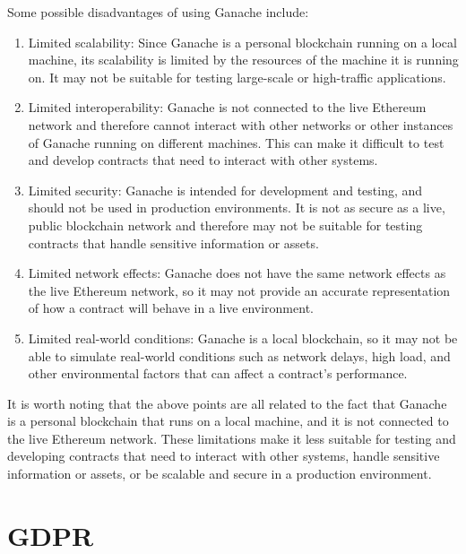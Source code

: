 \documentclass[target=mst,aauheader=]{thud}
\begin{document}
Some possible disadvantages of using Ganache include:

\begin{enumerate}

    \item Limited scalability: Since Ganache is a personal blockchain running on a local machine, its scalability is limited by the resources of the machine it is running on. It may not be suitable for testing large-scale or high-traffic applications.
    \item Limited interoperability: Ganache is not connected to the live Ethereum network and therefore cannot interact with other networks or other instances of Ganache running on different machines. This can make it difficult to test and develop contracts that need to interact with other systems.
    \item Limited security: Ganache is intended for development and testing, and should not be used in production environments. It is not as secure as a live, public blockchain network and therefore may not be suitable for testing contracts that handle sensitive information or assets.
    \item Limited network effects: Ganache does not have the same network effects as the live Ethereum network, so it may not provide an accurate representation of how a contract will behave in a live environment.
    \item Limited real-world conditions: Ganache is a local blockchain, so it may not be able to simulate real-world conditions such as network delays, high load, and other environmental factors that can affect a contract's performance.

\end{enumerate}

It is worth noting that the above points are all related to the fact that Ganache is a personal blockchain that runs on a local machine, and it is not connected to the live Ethereum network. These limitations make it less suitable for testing and developing contracts that need to interact with other systems, handle sensitive information or assets, or be scalable and secure in a production environment.

\chapter{GDPR}
\label{appendixGDPR}
\end{document}
